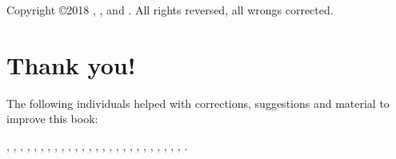 

\thispagestyle{empty}
\beforepartskip

\newlength{\centeroffset}
\setlength{\centeroffset}{-0.5\oddsidemargin}
\addtolength{\centeroffset}{0.5\evensidemargin}
\thispagestyle{empty}
\noindent\hspace*{\centeroffset}\makebox[0pt][l]{\begin{minipage}{\textwidth}
\flushright
{\Huge\bfseries \maintitle}
\noindent\rule[-1ex]{\textwidth}{5pt}\\[2.5ex]
\hfill\emph{\Large \subtitle}
\end{minipage}}

\noindent\hspace*{\centeroffset}


\pagebreak
\let\cleardoublepage\clearpage

\sloppy
\frontmatter
\begin{small} 
  \noindent Copyright \copyright 2018 \authora, \authorb, and \authorc.
  All rights reversed, all wrongs corrected.

  \lipsum[1]
\end{small}

\chapter{Thank you!}
\noindent%
\lipsum[1]

\newpage \noindent%
The following individuals helped with corrections, suggestions and
material to improve this book:

{\flushleft\small
\authora,
\authorb,
\authorc,
\authora,
\authorb,
\authorc,
\authora,
\authorb,
\authorc,
\authora,
\authorb,
\authorc,
\authora,
\authorb,
\authorc,
\authora,
\authorb,
\authorc,
\authora,
\authorb,
\authorc,
\authora,
\authorb,
\authorc,
\authora,
\authorb,
\authorc.
}

